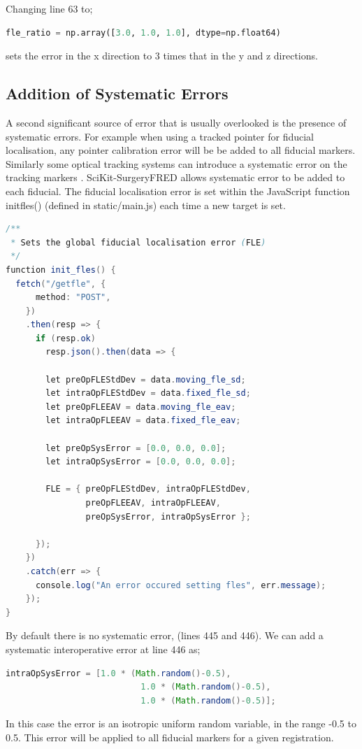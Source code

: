 Changing line 63 to;
\begin{lstlisting}[language=python, firstnumber=63]
    fle_ratio = np.array([3.0, 1.0, 1.0], dtype=np.float64)
\end{lstlisting}
sets the error in the x direction to 3 times that in the y and z directions.  

\subsection{Addition of Systematic Errors}
\label{sec:sys_method}
A second significant source of error that is usually overlooked is the presence of systematic errors. For example when using a tracked pointer for fiducial localisation, 
any pointer calibration error will be be added to all fiducial markers.
Similarly some optical tracking systems can introduce a systematic error on 
the tracking markers \cite{6294449}. {SciKit-SurgeryFRED} allows systematic error to 
be added to each fiducial. The fiducial localisation error is set within 
the JavaScript function init{\textunderscore}fles()
(defined in static/main.js) each time a new target is set. 
\begin{lstlisting}[language=java, firstnumber = 429]
/**
 * Sets the global fiducial localisation error (FLE)
 */
function init_fles() {
  fetch("/getfle", {
      method: "POST",
    })
    .then(resp => {
      if (resp.ok)
        resp.json().then(data => {

        let preOpFLEStdDev = data.moving_fle_sd;
        let intraOpFLEStdDev = data.fixed_fle_sd;
        let preOpFLEEAV = data.moving_fle_eav;
        let intraOpFLEEAV = data.fixed_fle_eav;

        let preOpSysError = [0.0, 0.0, 0.0];
        let intraOpSysError = [0.0, 0.0, 0.0];

        FLE = { preOpFLEStdDev, intraOpFLEStdDev,
                preOpFLEEAV, intraOpFLEEAV,
                preOpSysError, intraOpSysError };

      });
    })
    .catch(err => {
      console.log("An error occured setting fles", err.message);
    });
}
\end{lstlisting}
By default there is no systematic error, (lines 445 and 446). We can 
add a systematic interoperative error at line 446 as; 

\begin{lstlisting}[language=java, firstnumber = 446]
        intraOpSysError = [1.0 * (Math.random()-0.5), 
                           1.0 * (Math.random()-0.5), 
                           1.0 * (Math.random()-0.5)];
\end{lstlisting}

In this case the error is an isotropic uniform random variable, in the range
-0.5 to 0.5. This error will be applied to all fiducial markers for a 
given registration. 



